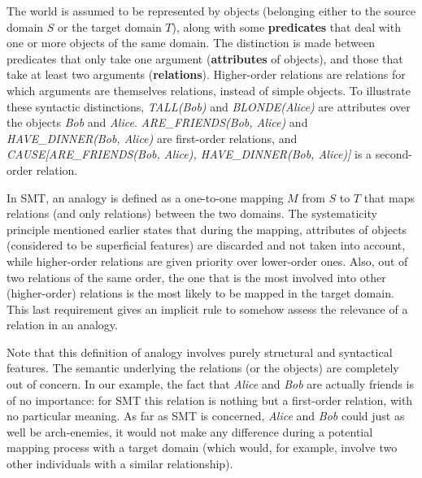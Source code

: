 The world is assumed to be represented by objects (belonging either to the
source domain $S$ or the target domain $T$), along with some
\textbf{predicates} that deal with one or more objects of the same domain. The
distinction is made between predicates that only take one argument
(\textbf{attributes} of objects), and those  that take at least two arguments 
(\textbf{relations}). Higher-order relations are relations for which arguments
are themselves relations, instead of simple objects. To illustrate these
syntactic distinctions, \textit{TALL(Bob)} and \textit{BLONDE(Alice)} are
attributes over the objects \textit{Bob} and \textit{Alice}.
\textit{ARE\_FRIENDS(Bob, Alice)} and \textit{HAVE\_DINNER(Bob, Alice)} are
first-order relations, and \textit{CAUSE[ARE\_FRIENDS(Bob, Alice),
HAVE\_DINNER(Bob, Alice)]} is a second-order relation.

In SMT, an analogy is defined as a one-to-one mapping $M$ from $S$ to $T$ that maps
relations (and only relations) between the two domains. The systematicity
principle mentioned earlier states that during the mapping, attributes of
objects (considered to be superficial features) are discarded and not taken
into account, while higher-order relations are given priority over lower-order
ones. Also, out of two relations of the same order, the one that is the most
involved into other (higher-order) relations is the most likely to be mapped in
the target domain. This last requirement gives an implicit rule to somehow
assess the relevance of a relation in an analogy.

Note that this definition of analogy involves purely structural and syntactical
features. The semantic underlying the relations (or the objects) are completely
out of concern. In our example, the fact that \textit{Alice} and \textit{Bob}
are actually friends is of no importance: for SMT this relation is nothing but
a first-order relation, with no particular meaning. As far as SMT is concerned,
\textit{Alice} and \textit{Bob} could just as well be arch-enemies, it would
not make any difference during a potential mapping process with a target domain
(which would, for example, involve two other individuals with a similar
relationship).

